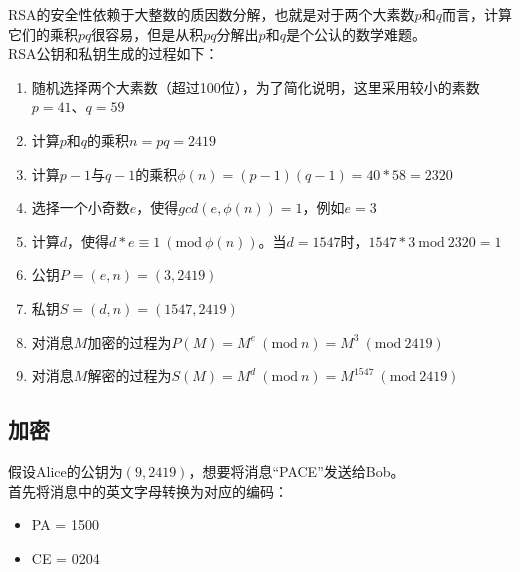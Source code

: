RSA的安全性依赖于大整数的质因数分解，也就是对于两个大素数$ p $和$ q $而言，计算它们的乘积$ pq $很容易，但是从积$ pq $分解出$ p $和$ q $是个公认的数学难题。\\

RSA公钥和私钥生成的过程如下：

\begin{enumerate}
    \item 随机选择两个大素数（超过100位），为了简化说明，这里采用较小的素数$ p = 41 $、$ q = 59 $

    \item 计算$ p $和$ q $的乘积$ n = pq = 2419 $

    \item 计算$ p - 1 $与$ q - 1 $的乘积$ \phi(n) = (p-1)(q-1) = 40 * 58 = 2320 $

    \item 选择一个小奇数$ e $，使得$ gcd(e, \phi(n)) = 1$，例如$ e = 3 $

    \item 计算$ d $，使得$ d * e \equiv 1\ (\text{mod}\ \phi(n)) $。当$ d = 1547 $时，$ 1547 * 3\ \text{mod}\ 2320 = 1 $

    \item 公钥$ P = (e, n) = (3, 2419) $

    \item 私钥$ S = (d, n) = (1547, 2419) $

    \item 对消息$ M $加密的过程为$ P(M) = M^e\ (\text{mod}\ n) = M^3\ (\text{mod}\ 2419) $

    \item 对消息$ M $解密的过程为$ S(M) = M^d\ (\text{mod}\ n) = M^{1547}\ (\text{mod}\ 2419) $
\end{enumerate}

\vspace{0.5cm}

\subsection{加密}

假设Alice的公钥为$ (9, 2419) $，想要将消息“PACE”发送给Bob。\\

首先将消息中的英文字母转换为对应的编码：

\begin{itemize}
    \item PA = 1500
    \item CE = 0204
\end{itemize}

